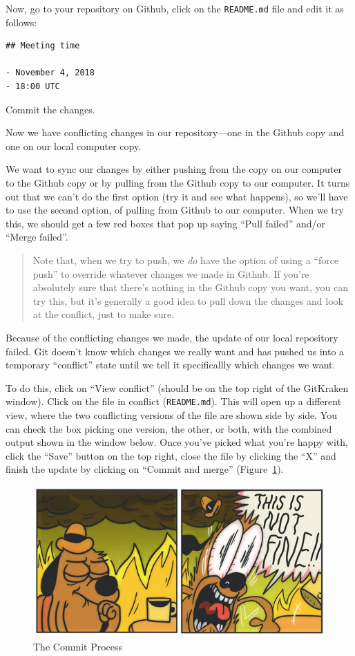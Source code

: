 \documentclass[]{Nemilov}
\begin{document}
Now, go to your repository on Github, click on the \texttt{README.md} file and edit
it as follows:

\begin{verbatim}
## Meeting time

- November 4, 2018
- 18:00 UTC
\end{verbatim}

Commit the changes.

Now we have conflicting changes in our repository---one in the Github copy
and one on our local computer copy.

We want to sync our changes by either pushing from the copy on our computer to
the Github copy or by pulling from the Github copy to our computer. It turns
out that we can't do the first option (try it and see what happens), so we'll
have to use the second option, of pulling from Github to our computer. When
we try this, we should get a few red boxes that pop up saying ``Pull failed''
and/or ``Merge failed''.

\begin{quote}
Note that, when we try to push, we \emph{do} have the option of using a ``force
push'' to override whatever changes we made in Github. If you're absolutely
sure that there's nothing in the Github copy you want, you can try this, but
it's generally a good idea to pull down the changes and look at the conflict,
just to make sure.
\end{quote}

Because of the conflicting changes we made, the update of our
local repository failed. Git doesn't know
which changes we really want and has pushed us into a temporary ``conflict''
state until we tell it specificallly which changes we want.

To do this, click on ``View conflict'' (should be on the top right of the
GitKraken window). Click on the file in conflict (\texttt{README.md}). This will
open up a different view, where the two conflicting versions of the file
are shown side by side. You can check the box picking one version, the other,
or both, with the combined output shown in the window below. Once you've
picked what you're happy with, click the ``Save'' button on the top right, close
the file by clicking the ``X'' and finish the update by clicking on
``Commit and merge'' (Figure~\ref{fig:py-version-control-committing}).

\begin{figure}
\centering
\includegraphics{figures/FIXME.png}
\caption{\label{fig:py-version-control-committing}The Commit Process}
\end{figure}
\end{document}
